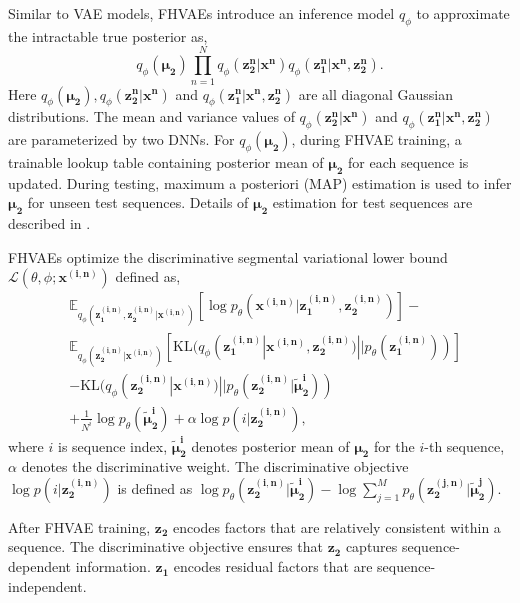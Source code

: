 \documentclass[a4paper]{article}
\begin{document}
Similar to VAE models, FHVAEs introduce an inference model $q_{\phi}$
to approximate the intractable  true posterior as,
\begin{equation}
   q_{\phi} (\bm{\mu_2})\prod_{n=1}^{N}q_{\phi} (\bm{z_2^n}| \bm{x^n}) q_{\phi}(\bm{z_1^n}|\bm{x^n}, \bm{z_2^n}).
   \label{eqt:inference}
\end{equation}
Here  $q_{\phi} (\bm{\mu_2}), q_{\phi} (\bm{z_2^n}| \bm{x^n})$ and $q_{\phi}(\bm{z_1^n}|\bm{x^n}, \bm{z_2^n})$ are all diagonal Gaussian distributions. The mean and variance values of $q_{\phi} (\bm{z_2^n}| \bm{x^n})$ and $q_{\phi}(\bm{z_1^n}|\bm{x^n}, \bm{z_2^n})$ are parameterized by two DNNs. For $q_{\phi} (\bm{\mu_2})$, during FHVAE training, a trainable lookup table containing posterior mean of $\bm{\mu_2}$ for each sequence is updated.
During testing, maximum a posteriori (MAP) estimation is used to infer  $\bm{\mu_2}$ for unseen test sequences. 
Details of $\bm{\mu_2}$ estimation for test sequences are described in \cite{hsu2017nips}.

FHVAEs optimize the discriminative segmental variational lower bound $\mathcal{L} (\theta, \phi; \bm{x^{(i,n)}})$ defined as,
\begin{align*}
&\mathbb{E}_{q_{\phi} (\bm{z_1^{(i,n)}},\bm{z_2^{(i,n)}}|\bm{x^{(i,n)}} )} [\log p_{\theta} (\bm{x^{(i,n)}}|\bm{z_1^{(i,n)}}, \bm{z_2^{(i,n)}})] -\\
& \mathbb{E}_{q_{\phi}(\bm{z_2^{(i,n)}} |\bm{x^{(i,n)}} )} [\mathrm{KL} (q_{\phi} (\bm{z_1^{(i,n)}}|\bm{x^{(i,n)}}, \bm{z_2^{(i,n)}})||p_{\theta} (\bm{z_1^{(i,n)}}))]\\
&-\mathrm{KL} (q_{\phi}(\bm{z_2 ^{(i,n)}}|\bm{x^{(i,n)}})|| p_{\theta}(\bm{z_2 ^{(i,n)}}| \bm{\tilde{\mu}_2^i})) \\
&+\frac{1}{N^i}\log p_{\theta} (\bm{\tilde{\mu}_2^i}) + \alpha \log p(i| \bm{z_2^{(i,n)}}),
\end{align*}
where $i$ is sequence index, $\bm{\tilde{\mu}_2^{i}}$ denotes posterior mean of $\bm{\mu_2}$ for the $i$-th sequence, $\alpha$ denotes the  discriminative weight. The discriminative objective $\log p(i| \bm{z_2^{(i,n)}}) $ is defined as $\log p_{\theta} (\bm{z_2^{(i,n)}}| \bm{\tilde{\mu}_2^i})-\log \sum_{j=1}^{M}p_{\theta} (\bm{z_2^{(j,n)}}| \bm{\tilde{\mu}_2^j})$.

After FHVAE training, $\bm{z_2}$ encodes factors that are relatively consistent within a sequence.
The discriminative objective ensures that $\bm{z_2}$ captures sequence-dependent information. $\bm{z_1}$ encodes residual factors that are sequence-independent.
\end{document}
